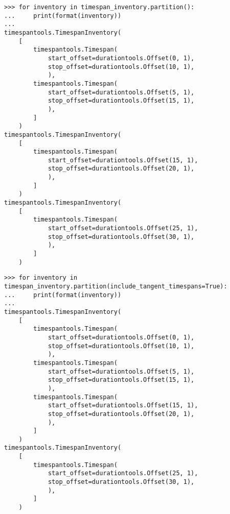 \begin{comment}
<abjad>
for inventory in timespan_inventory.partition():
    print(format(inventory))

</abjad>
\end{comment}

\begin{singlespacing}
\vspace{-0.5\baselineskip}
\begin{lstlisting}
>>> for inventory in timespan_inventory.partition():
...     print(format(inventory))
...
timespantools.TimespanInventory(
    [
        timespantools.Timespan(
            start_offset=durationtools.Offset(0, 1),
            stop_offset=durationtools.Offset(10, 1),
            ),
        timespantools.Timespan(
            start_offset=durationtools.Offset(5, 1),
            stop_offset=durationtools.Offset(15, 1),
            ),
        ]
    )
timespantools.TimespanInventory(
    [
        timespantools.Timespan(
            start_offset=durationtools.Offset(15, 1),
            stop_offset=durationtools.Offset(20, 1),
            ),
        ]
    )
timespantools.TimespanInventory(
    [
        timespantools.Timespan(
            start_offset=durationtools.Offset(25, 1),
            stop_offset=durationtools.Offset(30, 1),
            ),
        ]
    )
\end{lstlisting}
\end{singlespacing}

\begin{comment}
<abjad>
for inventory in timespan_inventory.partition(include_tangent_timespans=True):
    print(format(inventory))

</abjad>
\end{comment}

\begin{singlespacing}
\vspace{-0.5\baselineskip}
\begin{lstlisting}
>>> for inventory in timespan_inventory.partition(include_tangent_timespans=True):
...     print(format(inventory))
...
timespantools.TimespanInventory(
    [
        timespantools.Timespan(
            start_offset=durationtools.Offset(0, 1),
            stop_offset=durationtools.Offset(10, 1),
            ),
        timespantools.Timespan(
            start_offset=durationtools.Offset(5, 1),
            stop_offset=durationtools.Offset(15, 1),
            ),
        timespantools.Timespan(
            start_offset=durationtools.Offset(15, 1),
            stop_offset=durationtools.Offset(20, 1),
            ),
        ]
    )
timespantools.TimespanInventory(
    [
        timespantools.Timespan(
            start_offset=durationtools.Offset(25, 1),
            stop_offset=durationtools.Offset(30, 1),
            ),
        ]
    )
\end{lstlisting}
\end{singlespacing}

